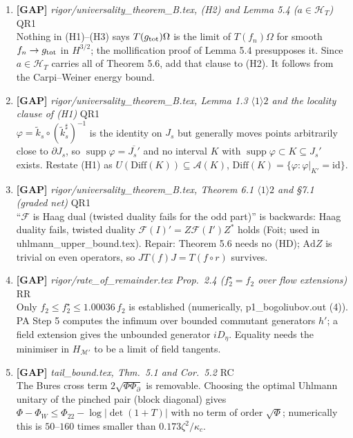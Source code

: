 \documentclass[11pt]{article}
\begin{document}
\begin{enumerate}[leftmargin=1.6em,itemsep=6pt]
\item \textbf{[GAP]} \emph{rigor/universality\_theorem\_B.tex, (H2) and Lemma 5.4 (\(a\in\mathcal H_T\))} \hfill\textsc{QR1}\\ Nothing in (H1)--(H3) says \(T(g_{\rm tot})\Omega\) is the limit of \(T(f_n)\Omega\) for smooth \(f_n\to g_{\rm tot}\) in \(H^{3/2}\); the mollification proof of Lemma 5.4 presupposes it. Since \(a\in\mathcal H_T\) carries all of Theorem 5.6, add that clause to (H2). It follows from the Carpi--Weiner energy bound.
\item \textbf{[GAP]} \emph{rigor/universality\_theorem\_B.tex, Lemma 1.3 \(\langle1\rangle2\) and the locality clause of (H1)} \hfill\textsc{QR1}\\ \(\varphi=\tilde k_s\circ(\tilde k_s^\sharp)^{-1}\) is the identity on \(J_s\) but generally moves points arbitrarily close to \(\partial J_s\), so \(\operatorname{supp}\varphi=\overline{J_s'}\) and no interval \(K\) with \(\operatorname{supp}\varphi\subset K\subseteq J_s'\) exists. Restate (H1) as \(U(\mathrm{Diff}(K))\subseteq\mathcal A(K)\), \(\mathrm{Diff}(K)=\{\varphi:\varphi|_{K'}=\mathrm{id}\}\).
\item \textbf{[GAP]} \emph{rigor/universality\_theorem\_B.tex, Theorem 6.1 \(\langle1\rangle2\) and \S7.1 (graded net)} \hfill\textsc{QR1}\\ ``\(\mathcal F\) is Haag dual (twisted duality fails for the odd part)'' is backwards: Haag duality fails, twisted duality \(\mathcal F(I)'=Z\mathcal F(I')Z^*\) holds (Foit; used in uhlmann\_upper\_bound.tex). Repair: Theorem 5.6 needs no (HD); \(\mathrm{Ad}Z\) is trivial on even operators, so \(JT(f)J=T(f\circ r)\) survives.
\item \textbf{[GAP]} \emph{rigor/rate\_of\_remainder.tex Prop.~2.4 (\(f_2^\star=f_2\) over flow extensions)} \hfill\textsc{RR}\\ Only \(f_2\le f_2^\star\le1.00036\,f_2\) is established (numerically, p1\_bogoliubov.out (4)). PA Step 5 computes the infimum over bounded commutant generators \(h'\); a field extension gives the unbounded generator \(iD_\eta\). Equality needs the minimiser in \(H_{\mathcal M'}\) to be a limit of field tangents.
\item \textbf{[GAP]} \emph{tail\_bound.tex, Thm.~5.1 and Cor.~5.2} \hfill\textsc{RC}\\ The Bures cross term $2\sqrt{\Phi\Phi_\partial}$ is removable. Choosing the optimal Uhlmann unitary of the pinched pair (block diagonal) gives $\Phi-\Phi_W\le\Phi_{22}-\log\lvert\det(1+T)\rvert$ with no term of order $\sqrt\Phi$; numerically this is $50$--$160$ times smaller than $0.173\zeta^2/\kappa_c$.

\end{enumerate}
\end{document}

